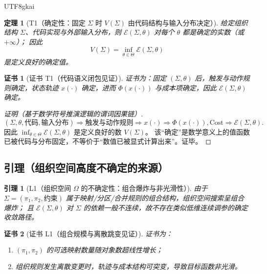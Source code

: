 \documentclass[12pt]{article}
\newtheorem{theorem}{定理}[section]
\newtheorem{lemma}{引理}[section]
\newtheorem{Certificate}{证书}[section]
\begin{document}
\begin{CJK*}{UTF8}{gkai}
\begin{theorem}[T1（确定性：固定 $\Sigma$ 时 $V(\Sigma)$ 由代码结构与输入分布决定）]
\label{thm:tex28-ch7-t1}
给定组织结构 $\Sigma$、代码实现与外部输入分布，则 $\mathcal{E}(\Sigma,\theta)$ 对每个 $\theta$ 都是确定的实数（或 $+\infty$）；
因此
\[
  V(\Sigma)=\inf_{\theta\in\Theta}\mathcal{E}(\Sigma,\theta)
\]
是定义良好的确定值。
\end{theorem}

\begin{Certificate}[证书 T1（代码语义闭包见证）]
\label{cert:tex28-ch7-t1}
证书为：固定 $(\Sigma,\theta)$ 后，触发与动作规则确定，状态轨迹 $x(\cdot)$ 确定，进而
$\Phi(x(\cdot))$ 与成本项确定，因此 $\mathcal{E}(\Sigma,\theta)$ 确定。
\end{Certificate}

\begin{proof}[证明（基于数学符号推演逻辑的谓词因果链）]
\[
  (\Sigma,\theta,\text{代码},\text{输入分布})
  \Rightarrow \text{触发与动作规则}
  \Rightarrow x(\cdot)
  \Rightarrow \Phi(x(\cdot)),\mathrm{Cost}
  \Rightarrow \mathcal{E}(\Sigma,\theta).
\]
因此 $\inf_{\theta\in\Theta}\mathcal{E}(\Sigma,\theta)$ 是定义良好的数 $V(\Sigma)$。
该“确定”是数学意义上的值函数已被代码与分布固定，不等价于“数值已被显式计算出来”。证毕。
\end{proof}

\subsection{引理（组织空间高度不确定的来源）}
\label{subsec:tex28-ch7-lemmas}

\begin{lemma}[L1（组织空间 $\Omega$ 的不确定性：组合爆炸与非光滑性）]
\label{lem:tex28-ch7-l1}
由于 $\Sigma=(\pi_1,\pi_2,\text{约束})$ 属于映射/分区/合并规则的组合结构，组织空间搜索呈组合爆炸；
且 $\mathcal{E}(\Sigma,\theta)$ 对 $\Sigma$ 的依赖一般不连续，故不存在类似低维连续调参的确定收敛路径。
\end{lemma}

\begin{Certificate}[证书 L1（组合规模与离散跳变见证）]
\label{cert:tex28-ch7-l1}
证书为：
\begin{enumerate}
  \item $(\pi_1,\pi_2)$ 的可选映射数量随对象数超线性增长；
  \item 组织规则发生离散变更时，轨迹与成本结构可突变，导致目标函数非光滑。
\end{enumerate}
\end{Certificate}


\end{CJK*}
\end{document}
